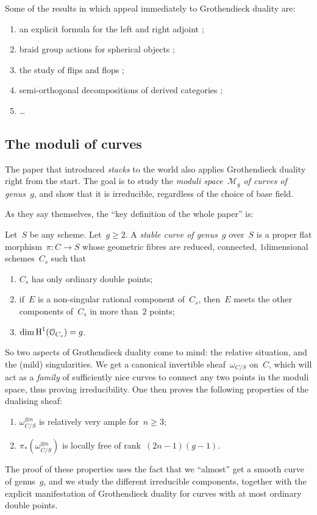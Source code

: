 \documentclass[10pt,a4paper]{article}
\begin{document}
Some of the results in \cite{huybrechts-fourier-mukai-transforms} which appeal immediately to Grothendieck duality are:
\begin{enumerate}
  \item an explicit formula for the left and right adjoint \cite[proposition 5.9]{huybrechts-fourier-mukai-transforms};
  \item braid group actions for spherical objects \cite[lemma 8.21]{huybrechts-fourier-mukai-transforms};
  \item the study of flips and flops \cite[\S 11.1]{huybrechts-fourier-mukai-transforms};
  \item semi-orthogonal decompositions of derived categories \cite[\S 11.2]{huybrechts-fourier-mukai-transforms} ;
  \item \ldots
\end{enumerate}


\subsection{The moduli of curves}
The paper that introduced \emph{stacks} to the world \cite{deligne-mumford-irreducibility-moduli-of-curves} also applies Grothendieck duality right from the start. The goal is to study the \emph{moduli space~$\mathcal{M}_g$ of curves of genus~$g$}, and show that it is irreducible, regardless of the choice of base field.

As they say themselves, the ``key definition of the whole paper'' is:
\begin{definition}
  Let~$S$ be any scheme. Let~$g\geq 2$. A \emph{stable curve of genus~$g$} over~$S$ is a proper flat morphism~$\pi\colon C\to S$ whose geometric fibres are reduced, connected, $1$\dash dimensional schemes~$C_s$ such that
  \begin{enumerate}
    \item $C_s$ has only ordinary double points;
    \item if~$E$ is a non-singular rational component of~$C_s$, then~$E$ meets the other components of~$C_s$ in more than~$2$ points;
    \item $\dim\operatorname{H}^1(\mathcal{O}_{C_s})=g$.
  \end{enumerate}
\end{definition}
So two aspects of Grothendieck duality come to mind: the relative situation, and the (mild) singularities. We get a canonical invertible sheaf~$\omega_{C/S}$ on~$C$, which will act as a \emph{family} of sufficiently nice curves to connect any two points in the moduli space, thus proving irreducibility. One then proves the following properties of the dualising sheaf:
\begin{enumerate}
  \item $\omega_{C/S}^{\otimes n}$ is relatively very ample for~$n\geq 3$;
  \item $\pi_*(\omega_{C/S}^{\otimes n})$ is locally free of rank~$(2n-1)(g-1)$.
\end{enumerate}
The proof of these properties uses the fact that we ``almost'' get a smooth curve of genus~$g$, and we study the different irreducible components, together with the explicit manifestation of Grothendieck duality for curves with at most ordinary double points.
\end{document}
